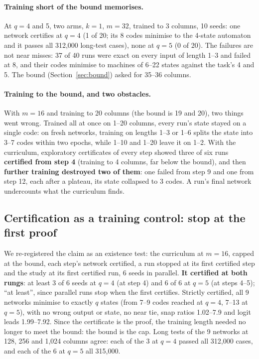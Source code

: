 \documentclass[11pt]{article}
\begin{document}
\paragraph{Training short of the bound memorises.} At $q = 4$ and 5, two arms, $k = 1$, $m = 32$,
trained to 3 columns, 10 seeds: one network certifies at $q = 4$ (1 of 20; its 8 codes minimise to
the 4-state automaton and it passes all 312{,}000 long-test cases), none at $q = 5$ (0 of 20). The
failures are not near misses: 37 of 40 runs were exact on every input of length 1--3 and
failed at 8, and their codes minimise to machines of 6--22 states against the task's 4 and 5. The
bound (Section~\ref{sec:bound}) asked for 35--36 columns.

\paragraph{Training to the bound, and two obstacles.} With $m = 16$ and training to 20 columns
(the bound is 19 and 20), two things went wrong. Trained all at once on 1--20 columns, every run's
state stayed on a single code: on fresh networks, training on lengths 1--3 or 1--6 splits the state
into 3--7 codes within two epochs, while 1--10 and 1--20 leave it on 1--2. With the curriculum,
exploratory certificates of every step showed three of six runs \textbf{certified from step 4}
(training to 4 columns, far below the bound), and then \textbf{further training destroyed two of
them}: one failed from step 9 and one from step 12, each after a plateau, its state collapsed to 3
codes. A run's final network undercounts what the curriculum finds.

\subsection{Certification as a training control: stop at the first proof}
\label{sec:existence}

We re-registered the claim as an existence test: the curriculum at $m = 16$, capped at the bound,
each step's network certified, a run stopped at its first certified step and the study at its first
certified run, 6 seeds in parallel. \textbf{It certified at both rungs}: at least 3 of 6 seeds at
$q = 4$ (at step 4) and 6 of 6 at $q = 5$ (at steps 4--5); ``at least'', since parallel runs stop when
the first certifies. Strictly certified, all 9 networks minimise to exactly $q$ states (from 7--9
codes reached at $q = 4$, 7--13 at $q = 5$), with no wrong output or state, no near tie, snap ratios
1.02--7.9 and logit leads 1.99--7.92. Since the certificate is the proof, the training length needed
no longer to meet the bound: the bound is the cap. Long tests of the 9 networks at 128, 256 and
1{,}024 columns agree: each of the 3 at $q = 4$ passed all 312{,}000 cases, and each of the 6 at
$q = 5$ all 315{,}000.
\end{document}
